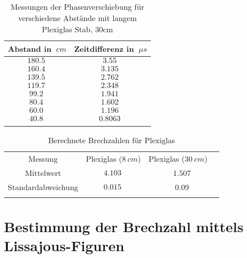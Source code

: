 \begin{table}[h!]
    \begin{center}
        \caption{Messungen der Phasenverschiebung für verschiedene Abstände mit langem Plexiglas Stab, 30cm}
        \begin{tabular}{cc}
            \hline
            Abstand in $\SI{}{cm}$ & Zeitdifferenz in $\SI{}{\mu s}$ \\
            \hline
            $\SI{180,5}{}$    & $\SI{3,55}{}$ \\
            $\SI{160,4}{}$    & $\SI{3,135}{}$ \\
            $\SI{139,5}{}$    & $\SI{2,762}{}$ \\
            $\SI{119,7}{}$    & $\SI{2,348}{}$ \\
            $\SI{99,2}{}$     & $\SI{1,941}{}$ \\
            $\SI{80,4}{}$     & $\SI{1,602}{}$ \\
            $\SI{60,0}{}$     & $\SI{1,196}{}$ \\
            $\SI{40,8}{}$     & $\SI{0,8063}{}$ \\
            \hline
            \label{tab:Messwerte-Zeitdiffernz-Abstand-Plexi-lang}
        \end{tabular}
    \end{center}
\end{table}

\begin{table}[h!]
    \begin{center}
        \caption{Berechnete Brechzahlen für Plexiglas}
        \begin{tabular}{cccc}
            \hline
            Messung            & Plexiglas ($\SI{8}{cm}$) & Plexiglas ($\SI{30}{cm}$)  \\
            Mittelwert         & $\SI{4,103}{}$        & \multicolumn{2}{c}{\SI{1,507}{}} \\
            Standardabweichung & $\SI{0,015}{}$       & \multicolumn{2}{c}{\SI{0,09}{}} \\
            \hline
            \label{tab:Ergebnisse-Brechzahlen}
        \end{tabular}
    \end{center}
\end{table}

\section{Bestimmung der Brechzahl mittels Lissajous-Figuren}

